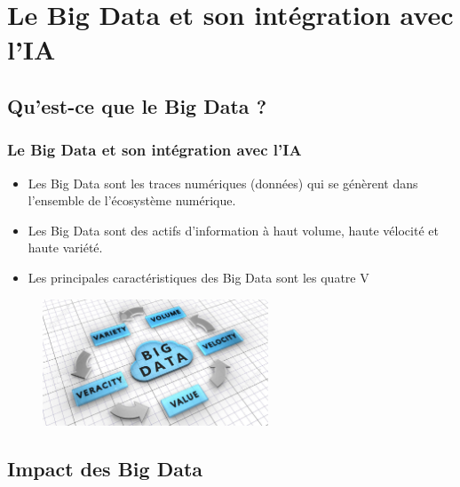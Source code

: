 \documentclass{beamer}
\begin{document}
\section{Le Big Data et son intégration avec l'IA}
\subsection{Qu'est-ce que le Big Data ?}
\begin{frame}
	\frametitle{Le Big Data et son intégration avec l'IA}
	
	\begin{itemize}
		\item Les Big Data sont les traces numériques (données) qui se génèrent dans l'ensemble de l'écosystème numérique.
		\item Les Big Data sont des actifs d'information à haut volume, haute vélocité et haute variété.
		
		\item Les principales caractéristiques des Big Data sont les quatre V 
	\end{itemize}
	
	\begin{figure}
		\centering
		\includegraphics[width=0.6\textwidth]{bigDa.jpg}
	\end{figure}
	
\end{frame}

\subsection{Impact des Big Data}
\end{document}
